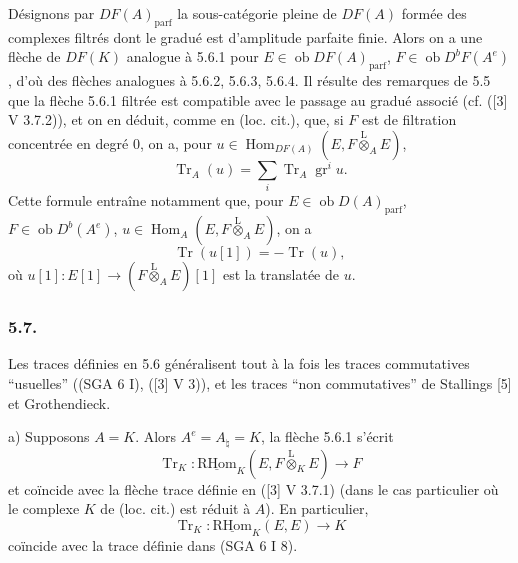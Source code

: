 \documentclass[11pt]{article}
\DeclareMathOperator{\Hom}{Hom}
\newcommand{\R}{\mathrm{R}}\newcommand{\RHomCore}{\mathrm{RHom}}
\newcommand{\ob}{\operatorname{ob}}
\providecommand{\RHom}{\RHomCore}
\providecommand{\uRHom}{\underline{\RHom}}
\providecommand{\Tr}{\operatorname{Tr}}
\providecommand{\Tr}{\operatorname{Tr}}
\providecommand{\lten}{\overset{\mathrm L}{\otimes}}
\providecommand{\Tr}{\operatorname{Tr}}
\providecommand{\RHom}{\RHomCore}
\providecommand{\Hom}{\operatorname{Hom}}
\providecommand{\ob}{\operatorname{ob}}
\providecommand{\lten}{\overset{\mathrm L}{\otimes}}
\providecommand{\RHom}{\R\mathcal{H}om}
\providecommand{\lten}{\overset{\mathrm L}{\otimes}}
\providecommand{\R}{\mathrm R}
\providecommand{\Tr}{\operatorname{Tr}}
\providecommand{\lten}{\overset{\mathrm L}{\otimes}}
\providecommand{\lten}{\overset{\mathrm L}{\otimes}}
\providecommand{\lten}{\overset{\mathrm L}{\otimes}}
\providecommand{\RHom}{\RHomCore}
\providecommand{\Hom}{\operatorname{Hom}}
\providecommand{\Tr}{\operatorname{Tr}}
\providecommand{\lten}{\overset{\mathrm L}{\otimes}}
\begin{document}
Désignons par $DF(A)_{\mathrm{parf}}$ la sous-catégorie pleine de $DF(A)$ formée des complexes filtrés dont le gradué est d'amplitude parfaite finie. Alors on a une flèche de $DF(K)$ analogue à 5.6.1 pour $E\in\ob DF(A)_{\mathrm{parf}}$, $F\in\ob D^bF(A^e)$, d'où des flèches analogues à 5.6.2, 5.6.3, 5.6.4. Il résulte des remarques de 5.5 que la flèche 5.6.1 filtrée est compatible avec le passage au gradué associé (cf. ([3] V 3.7.2)), et on en déduit, comme en (loc. cit.), que, si $F$ est de filtration concentrée en degré $0$, on a, pour $u\in\Hom_{DF(A)}(E,F\lten_AE)$,
\begin{equation}\tag{5.6.5}
\Tr_A(u)=\sum_i\Tr_A\operatorname{gr}^i u.
\end{equation}
Cette formule entraîne notamment que, pour $E\in\ob D(A)_{\mathrm{parf}}$, $F\in\ob D^b(A^e)$, $u\in\Hom_A(E,F\lten_AE)$, on a
\begin{equation}\tag{5.6.6}
\Tr(u[1])=-\Tr(u),
\end{equation}
où $u[1]:E[1]\to(F\lten_AE)[1]$ est la translatée de $u$.

\subsubsection*{5.7.}

Les traces définies en 5.6 généralisent tout à la fois les traces commutatives ``usuelles'' ((SGA 6 I), ([3] V 3)), et les traces ``non commutatives'' de Stallings [5] et Grothendieck.

a) Supposons $A=K$. Alors $A^e=A_\natural=K$, la flèche 5.6.1 s'écrit
\[
\Tr_K:\uRHom_K(E,F\lten_KE)\longrightarrow F
\]
et
coïncide avec la flèche trace définie en ([3] V 3.7.1) (dans le cas particulier où le complexe $K$ de (loc. cit.) est réduit à $A$). En particulier,
\[
\Tr_K:\uRHom_K(E,E)\longrightarrow K
\]
coïncide avec la trace définie dans (SGA 6 I 8).
\end{document}
